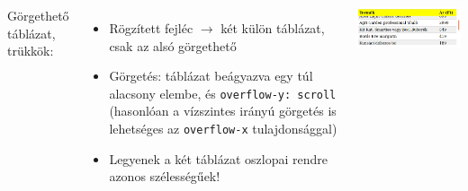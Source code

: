 \begin{frame}
  \begin{columns}[c]
      Görgethető táblázat, trükkök:
      \begin{itemize}
        \item Rögzített fejléc $\to$ két külön táblázat, csak az alsó görgethető
        \item Görgetés: táblázat beágyazva egy túl alacsony elembe, és \texttt{overflow-y: scroll} (hasonlóan a vízszintes irányú görgetés is lehetséges az \texttt{overflow-x} tulajdonsággal)
        \item Legyenek a két táblázat oszlopai rendre azonos szélességűek!
      \end{itemize}
      \includegraphics[width=\textwidth]{tablazat12.png}
  \end{columns}
\end{frame}

\begin{frame}
  \begin{exampleblock}{}
    \fontsize{7}{8} \selectfont
    
    
  \end{exampleblock}
\end{frame}

\begin{frame}
  \begin{exampleblock}{}
    \fontsize{7}{8} \selectfont
    
  \end{exampleblock}
\end{frame}

